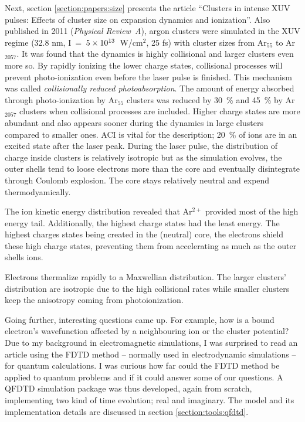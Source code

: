 Next, section \ref{section:papers:size} presents the article ``Clusters in
intense XUV pulses: Effects of cluster size on expansion dynamics and
ionization''. Also published in 2011 (\textit{Physical Review~A}\cite{Ackad2011b}),
argon clusters were simulated in the XUV regime (32.8 nm,
I~=~$\ten{5}{13}$~W/cm$^{2}$, 25 fs) with cluster sizes from Ar$_{55}$ to
Ar$_{2057}$. It was found that the dynamics is highly collisional and
larger clusters even more so. By rapidly ionizing the lower charge states,
collisional processes will prevent photo-ionization even before the laser pulse
is finished. This mechanism was called \textit{collisionally reduced photoabsorption}.
The amount of energy absorbed through photo-ionization by Ar$_{55}$ clusters was
reduced by 30~\% and 45~\% by Ar$_{2057}$ clusters when collisional processes
are included.
Higher charge states are more abundant and also appears sooner during the
dynamics in large clusters compared to smaller ones. ACI is vital for the
description; 20~\% of ions are in an excited state after the laser peak.
During the laser pulse, the distribution of charge inside clusters is
relatively isotropic but as the simulation evolves, the outer shells tend to
loose electrons more than the core and eventually disintegrate through Coulomb
explosion.
The core stays relatively neutral and expend thermodyamically.

The ion kinetic energy distribution revealed that Ar$^{2+}$  provided most of
the high energy tail. Additionally, the highest charge states had the least
energy. The highest charges states being created in the (neutral) core, the
electrons shield these high charge states, preventing them from accelerating
as much as the outer shells ions.

Electrons thermalize rapidly to a Maxwellian distribution. The larger clusters'
distribution are isotropic due to the high collisional rates while smaller
clusters keep the anisotropy coming from photoionization.







Going further, interesting questions came up. For example, how is a bound
electron's wavefunction affected by a neighbouring ion or the cluster potential?
Due to my background in electromagnetic simulations, I was surprised to read
an article using the FDTD method -- normally used in electrodynamic simulations --
for quantum calculations. I was curious how far could the FDTD method be
applied to quantum problems and if it could answer some of our questions.
A QFDTD simulation package was thus developed, again from scratch,  implementing
two kind of time evolution; real and imaginary. The model and its implementation details
are discussed in section \ref{section:tools:qfdtd}.

